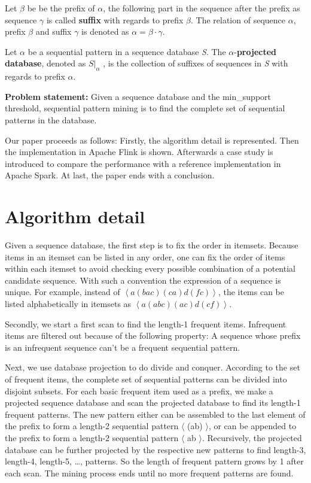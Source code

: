 \documentclass[a4paper,10pt,twocolumn]{article}
\begin{document}
Let $\beta$ be be the prefix of $\alpha$, the following part in the sequence after the prefix as sequence $\gamma$ is called \textbf{suffix} with regards to prefix $\beta$. The relation of sequence $\alpha$, prefix $\beta$ and suffix $\gamma$ is denoted as $\alpha = \beta \cdot \gamma $.

Let $\alpha$ be a sequential pattern in a sequence database \textit{S}. The $\alpha$-\textbf{projected database}, denoted as $S|_\alpha$ , is the collection of suffixes of sequences in \textit{S} with regards to prefix $\alpha$.

\textbf{Problem statement:} Given a sequence database and the min\_support threshold, sequential pattern mining is to find the complete set of sequential patterns in the database.


Our paper proceeds as follows: Firstly, the algorithm detail is represented. Then the implementation in Apache Flink is shown. Afterwards a case study is introduced to compare the performance with a reference implementation in Apache Spark. At last, the paper ends with a conclusion.

\section{Algorithm detail} \label{algorithmDetail}
Given a sequence database, the first step is to fix the order in itemsets. Because items in an itemset can be listed in any order, one can fix the order of items within each itemset to avoid checking every possible combination of a potential candidate sequence. With such a convention the expression of a sequence is unique. For example, instead of $\left<a(bac)(ca)d(fc)\right>$, the items can be listed alphabetically in itemsets as $\left<a(abc)(ac)d(cf)\right>$.

Secondly, we start a first scan to find the length-1 frequent items. Infrequent items are filtered out because of the following property: A sequence whose prefix is an infrequent sequence can't be a frequent sequential pattern.

Next, we use database projection to do divide and conquer. According to the set of frequent items, the complete set of sequential patterns can be divided into disjoint subsets. For each basic frequent item used as a prefix, we make a projected sequence database and scan the projected database to find its length-1 frequent patterns. The new pattern either can be assembled to the last element of the prefix to form a length-2 sequential pattern $\langle$ (ab) $\rangle$, or can be appended to the prefix to form a length-2 sequential pattern $\langle$ ab $\rangle$. Recursively, the projected database can be further projected by the respective new patterns to find length-3, length-4, length-5, \dots, patterns. So the length of frequent pattern grows by 1 after each scan. The mining process ends until no more frequent patterns are found.
\end{document}
